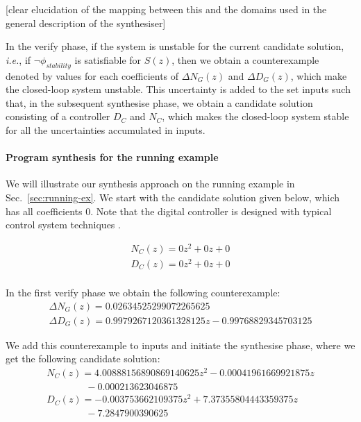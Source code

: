 \documentclass{sig-alternate-05-2015}
\newcommand{\red}[1]{{\color{red}#1}}
\begin{document}
\red{[clear elucidation of the mapping between this and the domains used 
in the general description of the synthesiser]}

In the {\sc verify} phase, if the system is unstable for the current candidate solution,
{\it i.e.}, if $\neg \phi_{stability}$ is satisfiable for $S(z)$, 
then we obtain a counterexample denoted by 
values for each coefficients of $\Delta N_{G}(z)$ and $\Delta D_{G}(z)$, 
which make the closed-loop system unstable. 
This uncertainty is added to 
the set {\sc inputs} such that, in the subsequent {\sc synthesise} phase, 
we obtain a candidate solution consisting 
of a controller $D_C$ and $N_C$, which makes the closed-loop 
system stable for all the uncertainties accumulated in {\sc inputs}.

\paragraph{Program synthesis for the running example}
We will illustrate our synthesis approach on the running example 
in Sec.~\ref{sec:running-ex}.
We start with the candidate solution given below, which has all coefficients 0.
Note that the digital controller is designed with typical control system
techniques \cite{Kuo:2002:ACS:579453,Ogata:1987:DCS:26170}.

$$
\begin{array}{ll}
N_C(z) {=} 0z^2{+}0z{+}0\\
D_C(z) {=} 0z^2{+}0z{+}0\\
\end{array}
$$


In the first {\sc verify} phase we obtain the following counterexample:
$$
\begin{array}{ll}
\Delta N_G(z) = 0.02634525299072265625\\
\Delta D_G(z) = 0.9979267120361328125z-0.99768829345703125
\end{array}
$$

We add this counterexample to {\sc inputs} and initiate the {\sc synthesise} phase, where we get the following candidate solution: 
$$
\begin{array}{ll}
N_C(z) {=} 4.00888156890869140625z^2{-}0.00041961669921875z\\
\qquad\qquad -0.000213623046875\\
D_C(z) {=} -0.003753662109375z^2{+}7.37355804443359375z \\
\qquad\qquad -7.2847900390625\\
\end{array}
$$
\end{document}
